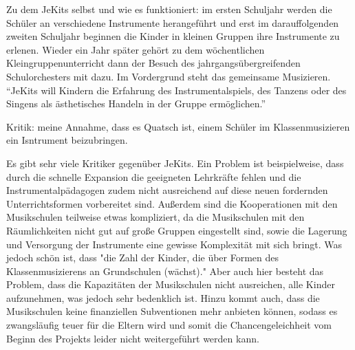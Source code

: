 Zu dem JeKits selbst und wie es funktioniert: im ersten Schuljahr werden die
Schüler an verschiedene Instrumente herangeführt und erst im darauffolgenden
zweiten Schuljahr beginnen die Kinder in kleinen Gruppen ihre Instrumente zu
erlenen. Wieder ein Jahr später gehört zu dem wöchentlichen
Kleingruppenunterricht dann der Besuch des jahrgangsübergreifenden
Schulorchesters mit dazu. Im Vordergrund steht das gemeinsame Musizieren.
\enquote{JeKits will Kindern die Erfahrung des Instrumentalspiels, des Tanzens
oder des Singens als ästhetisches Handeln in der Gruppe ermöglichen.}



Kritik: meine Annahme, dass es Quatsch ist, einem Schüler im Klassenmusizieren
ein Isntrument beizubringen.

Es gibt sehr viele Kritiker gegenüber JeKits. Ein Problem ist beispielweise,
dass durch die schnelle Expansion die geeigneten Lehrkräfte fehlen und die
Instrumentalpädagogen zudem nicht ausreichend auf diese neuen fordernden
Unterrichtsformen vorbereitet sind. Außerdem sind die Kooperationen mit den
Musikschulen teilweise etwas kompliziert, da die Musikschulen mit den
Räumlichkeiten nicht gut auf große Gruppen eingestellt sind, sowie die Lagerung
und Versorgung der Instrumente eine gewisse Komplexität mit sich bringt. Was
jedoch schön ist, dass "die Zahl der Kinder, die über Formen des
Klassenmusizierens an Grundschulen (wächst)." %
Aber auch hier besteht das Problem, dass die Kapazitäten der Musikschulen
nicht ausreichen, alle Kinder aufzunehmen, was jedoch sehr bedenklich ist. Hinzu
kommt auch, dass die Musikschulen keine finanziellen Subventionen mehr anbieten
können, sodass es zwangsläufig teuer für die Eltern wird und somit die
Chancengeleichheit vom Beginn des Projekts leider nicht weitergeführt werden
kann.






